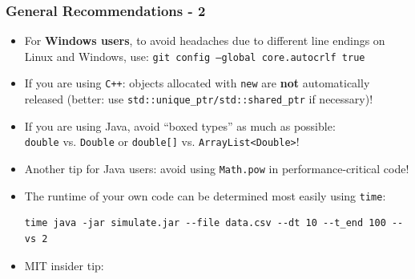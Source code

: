 \begin{frame}[fragile]
    \frametitle{General Recommendations - 2}
    \begin{itemize}
    \item For \textbf{Windows users}, to avoid headaches due to different line endings on Linux and Windows, use:
    \texttt{git config --global core.autocrlf true}
    \item If you are using \texttt{C++}: objects allocated with \texttt{new} are \textbf{not} automatically released (better: use \texttt{std::unique_ptr/std::shared_ptr} if necessary)!
    \item If you are using Java, avoid \enquote{boxed types} as much as possible:\\
    \texttt{double} vs. \texttt{Double} or \texttt{double[]} vs. \texttt{ArrayList<Double>}!
    \item Another tip for Java users: avoid using \texttt{Math.pow} in performance-critical code!
    \item The runtime of your own code can be determined most easily using \texttt{time}: \\[-.7em]
    {
        \small
        \begin{verbatim}
time java -jar simulate.jar --file data.csv --dt 10 --t_end 100 --vs 2
        \end{verbatim}
    }%
    \vspace*{-1.75em}
    \item MIT insider tip: 
    \end{itemize}
\end{frame}


